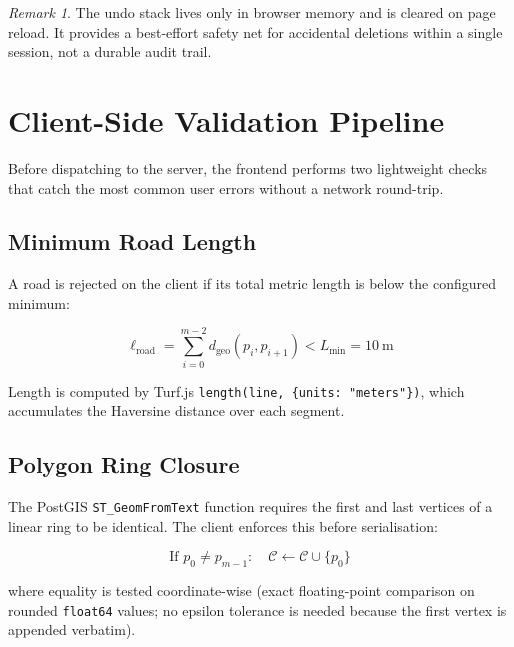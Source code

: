 \documentclass[12pt,a4paper]{article}
\theoremstyle{definition}
\theoremstyle{plain}
\theoremstyle{remark}
\newtheorem{remark}{Remark}[section]
\begin{document}
\begin{remark}
The undo stack lives only in browser memory and is cleared on page reload.
It provides a best-effort safety net for accidental deletions within a
single session, not a durable audit trail.
\end{remark}

\section{Client-Side Validation Pipeline}
\label{sec:client_validation}

Before dispatching to the server, the frontend performs two lightweight
checks that catch the most common user errors without a network round-trip.

\subsection{Minimum Road Length}

A road is rejected on the client if its total metric length is below
the configured minimum:

\begin{equation}
  \ell_{\text{road}} = \sum_{i=0}^{m-2} d_{\text{geo}}(p_i, p_{i+1})
  < L_{\min} = 10\ \mathrm{m}
  \label{eq:min_road_length}
\end{equation}

Length is computed by Turf.js \texttt{length(line, \{units: "meters"\})},
which accumulates the Haversine distance over each segment.

\subsection{Polygon Ring Closure}

The PostGIS \texttt{ST\_GeomFromText} function requires the first and last
vertices of a linear ring to be identical. The client enforces this before
serialisation:

\begin{equation}
  \text{If } p_0 \neq p_{m-1}:\quad \mathcal{C} \leftarrow \mathcal{C} \cup \{p_0\}
  \label{eq:ring_closure}
\end{equation}

where equality is tested coordinate-wise (exact floating-point comparison
on rounded \texttt{float64} values; no epsilon tolerance is needed because
the first vertex is appended verbatim).
\end{document}

